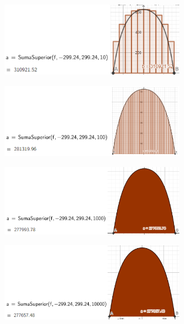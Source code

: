 \documentclass[12pt]{article}
\begin{document}
\begin{itemize}
\begin{enumerate}
                    \newpage
                    \begin{figure}[h!]
                        \centering
                        \includegraphics[width=0.7\textwidth]{img/t6-ej1-5.png}
                    \end{figure}
                    \begin{figure}[h!]
                        \centering
                        \includegraphics[width=0.7\textwidth]{img/t6-ej1-6.png}
                    \end{figure}
                    \begin{figure}[h!]
                        \centering
                        \includegraphics[width=0.7\textwidth]{img/t6-ej1-7.png}
                    \end{figure}
                    \begin{figure}[h!]
                        \centering
                        \includegraphics[width=0.7\textwidth]{img/t6-ej1-8.png}

\end{figure}
\end{enumerate}
\end{itemize}
\end{document}
